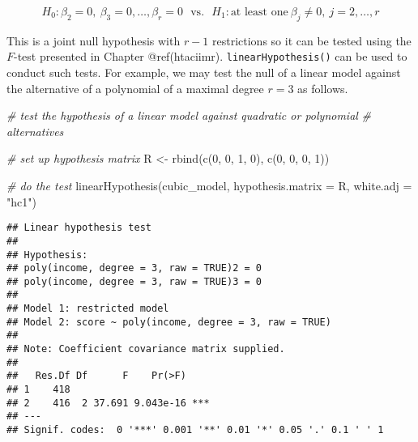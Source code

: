 \documentclass[
]{article}
\newenvironment{Shaded}{\begin{snugshade}}{\end{snugshade}}
\newcommand{\AttributeTok}[1]{\textcolor[rgb]{0.77,0.63,0.00}{#1}}
\newcommand{\CommentTok}[1]{\textcolor[rgb]{0.56,0.35,0.01}{\textit{#1}}}
\newcommand{\DecValTok}[1]{\textcolor[rgb]{0.00,0.00,0.81}{#1}}
\newcommand{\FunctionTok}[1]{\textcolor[rgb]{0.00,0.00,0.00}{#1}}
\newcommand{\NormalTok}[1]{#1}
\newcommand{\OtherTok}[1]{\textcolor[rgb]{0.56,0.35,0.01}{#1}}
\newcommand{\StringTok}[1]{\textcolor[rgb]{0.31,0.60,0.02}{#1}}
\begin{document}
\[ H_0: \beta_2=0, \ \beta_3=0,\dots,\beta_r=0 \ \ \ \text{vs.} \ \ \ H_1: \text{at least one} \ \beta_j\neq0, \ j=2,\dots,r \]

This is a joint null hypothesis with \(r-1\) restrictions so it can be
tested using the \(F\)-test presented in Chapter @ref(htaciimr).
\texttt{linearHypothesis()} can be used to conduct such tests. For
example, we may test the null of a linear model against the alternative
of a polynomial of a maximal degree \(r=3\) as follows.

\begin{Shaded}
\begin{Highlighting}[]
\CommentTok{\# test the hypothesis of a linear model against quadratic or polynomial}
\CommentTok{\# alternatives}

\CommentTok{\# set up hypothesis matrix}
\NormalTok{R }\OtherTok{\textless{}{-}} \FunctionTok{rbind}\NormalTok{(}\FunctionTok{c}\NormalTok{(}\DecValTok{0}\NormalTok{, }\DecValTok{0}\NormalTok{, }\DecValTok{1}\NormalTok{, }\DecValTok{0}\NormalTok{),}
            \FunctionTok{c}\NormalTok{(}\DecValTok{0}\NormalTok{, }\DecValTok{0}\NormalTok{, }\DecValTok{0}\NormalTok{, }\DecValTok{1}\NormalTok{))}

\CommentTok{\# do the test}
\FunctionTok{linearHypothesis}\NormalTok{(cubic\_model,}
                 \AttributeTok{hypothesis.matrix =}\NormalTok{ R,}
                 \AttributeTok{white.adj =} \StringTok{"hc1"}\NormalTok{)}
\end{Highlighting}
\end{Shaded}

\begin{verbatim}
## Linear hypothesis test
## 
## Hypothesis:
## poly(income, degree = 3, raw = TRUE)2 = 0
## poly(income, degree = 3, raw = TRUE)3 = 0
## 
## Model 1: restricted model
## Model 2: score ~ poly(income, degree = 3, raw = TRUE)
## 
## Note: Coefficient covariance matrix supplied.
## 
##   Res.Df Df      F    Pr(>F)    
## 1    418                        
## 2    416  2 37.691 9.043e-16 ***
## ---
## Signif. codes:  0 '***' 0.001 '**' 0.01 '*' 0.05 '.' 0.1 ' ' 1
\end{verbatim}
\end{document}
